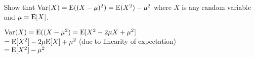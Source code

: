 \question Show that $\text{Var}(X) = \text{E}((X - \mu)^2) = \text{E}(X^2) - \mu^2$ where $X$ is any random variable and $\mu = \text{E}[X]$. 

\begin{solution}[1.5 cm]
\begin{center}
$\text{Var}(X) = \text{E}((X - \mu^2) = \text{E}[X^2 - 2\mu X + \mu^2]$ \\[2mm]
$= \text{E}[X^2] - 2\mu\text{E}[X] + \mu^2 $ (due to linearity of expectation) \\[2mm]
$ = \text{E}[X^2] - \mu^2 $
\end{center}
\end{solution}